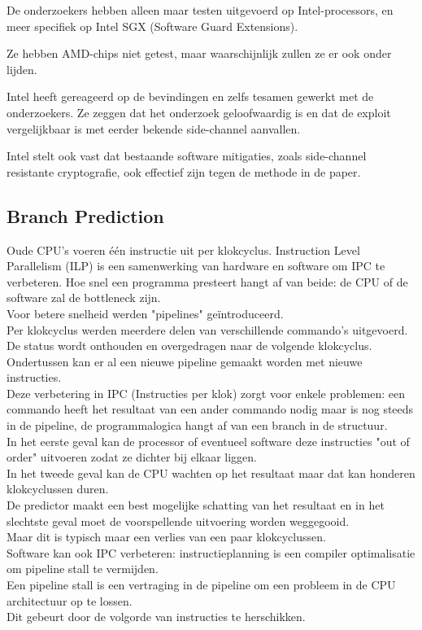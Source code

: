 De onderzoekers hebben alleen maar testen uitgevoerd op Intel-processors, en meer specifiek op Intel SGX (Software Guard Extensions).

Ze hebben AMD-chips niet getest, maar waarschijnlijk zullen ze er ook onder lijden.

Intel heeft gereageerd op de bevindingen en zelfs tesamen gewerkt met de onderzoekers.
Ze zeggen dat het onderzoek geloofwaardig is en dat de exploit vergelijkbaar is met eerder bekende side-channel aanvallen.

Intel stelt ook vast dat bestaande software mitigaties, zoals side-channel resistante cryptografie, ook effectief zijn tegen de methode in de paper.

\subsection{Branch Prediction}
Oude CPU's voeren één instructie uit per klokcyclus.
Instruction Level Parallelism (ILP) is een samenwerking van hardware en software om IPC te verbeteren. Hoe snel een programma presteert hangt af van beide: de CPU of de software zal de bottleneck zijn.\\
 Voor betere snelheid werden "pipelines" geïntroduceerd.\\ Per klokcyclus werden meerdere delen van verschillende commando's uitgevoerd. De status wordt onthouden en overgedragen naar de volgende klokcyclus.\\ Ondertussen kan er al een nieuwe pipeline gemaakt worden met nieuwe instructies.\\ Deze verbetering in IPC (Instructies per klok) zorgt voor enkele problemen: een commando heeft het resultaat van een ander commando nodig maar is nog steeds in de pipeline, de programmalogica hangt af van een branch in de structuur.\\ In het eerste geval kan de processor of eventueel software deze instructies "out of order" uitvoeren zodat ze dichter bij elkaar liggen.\\ In het tweede geval kan de CPU wachten op het resultaat maar dat kan honderen klokcyclussen duren.\\ De predictor maakt een best mogelijke schatting van het resultaat en in het slechtste geval moet de voorspellende uitvoering  worden weggegooid.\\
Maar dit is typisch maar een verlies van een paar klokcyclussen.\\
Software kan ook IPC verbeteren: instructieplanning is een compiler optimalisatie om pipeline stall te vermijden.\\
Een pipeline stall is een vertraging in de pipeline om een probleem in de CPU architectuur op te lossen.\\
Dit gebeurt door de volgorde van instructies te herschikken.

